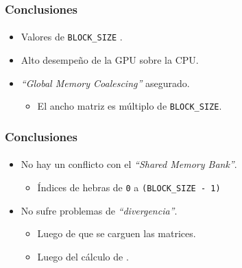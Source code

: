 \frame
{
\frametitle{Conclusiones}
\framesubtitle{}
\begin{itemize}
	\item<1-> Valores de \texttt{BLOCK\_SIZE} \blue{[2,40]}.
	\item<2-> Alto desempeño de la GPU sobre la CPU.
	\item<3-> \emph{``Global Memory Coalescing''} asegurado.
	\begin{itemize}
		\item<4-> El ancho matriz es múltiplo de \texttt{BLOCK\_SIZE}.
	\end{itemize}
\end{itemize}
}

\frame
{
\frametitle{Conclusiones}
\framesubtitle{}
\begin{itemize}
	\item<1-> No hay un conflicto con el \emph{``Shared Memory Bank''}.
	\begin{itemize}
		\item<2-> Índices de hebras de \texttt{0} a \texttt{(BLOCK\_SIZE - 1)}
	\end{itemize}
	\item<3-> No sufre problemas de \emph{``divergencia''}.
	\begin{itemize}
		\item <4-> Luego de que se carguen las matrices.
		\item <5-> Luego del cálculo de .
	\end{itemize}
\end{itemize}
}
